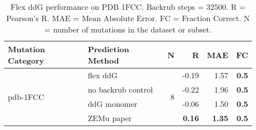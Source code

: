 \begin{table}
  \begin{tabular}{llrrrr}
\toprule
Mutation Category &   Prediction Method &  N &     R &  MAE &  FC \\
\midrule
 \multirow{ 4}{*}{pdb-1FCC} & flex ddG & \multirow{ 4}{*}{8} & -0.19 & 1.57 & \textbf{0.5}  \\
 & no backrub control & & -0.22 & 1.96 & \textbf{0.5}  \\
 & ddG monomer & & -0.06 & 1.50 & \textbf{0.5}  \\
 & ZEMu paper & & \textbf{0.16} & \textbf{1.35} & \textbf{0.5}  \\
\bottomrule
\end{tabular}
  \caption[Flex ddG performance on PDB 1FCC]{
    Flex ddG performance on PDB 1FCC. Backrub steps = 32500. R = Pearson's R. MAE = Mean Absolute Error. FC = Fraction Correct. N = number of mutations in the dataset or subset.
  } \label{tab:table-pdb-1FCC}
\end{table}
